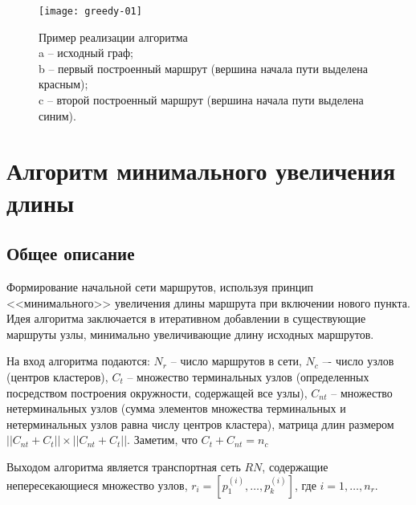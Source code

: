 \begin{figure}[h!]
    \centering
    \texttt{[image: greedy-01]}
    \caption{Пример реализации алгоритма\\
        a -- исходный граф;\\
        b -- первый построенный маршрут (вершина начала пути выделена красным);\\
        c -- второй построенный маршрут (вершина начала пути выделена синим).
    }
   \label{img:greedy-01}
\end{figure}


\section{Алгоритм минимального увеличения длины}
\label{sec:second_alg}
\subsection{Общее описание}

Формирование начальной сети маршрутов, используя принцип <<минимального>> увеличения длины маршрута при 
включении нового пункта. Идея алгоритма заключается в итеративном добавлении в существующие маршруты узлы, 
минимально увеличивающие длину исходных маршрутов. 

На вход алгоритма подаются: \( N_r \) -- число маршрутов в сети, \( N_c \) –- число узлов 
(центров кластеров), \( C_t \) – множество терминальных узлов (определенных посредством построения 
окружности, содержащей все узлы), \( C_{nt} \) -- множество нетерминальных узлов (сумма элементов множества 
терминальных и нетерминальных узлов равна числу центров кластера), матрица длин размером 
\( ||{C_{nt}} + {C_{t}}|| \times ||{C_{nt}} + {C_{t}}|| \). Заметим, что \( C_t + C_{nt} = n_c \)

Выходом алгоритма является транспортная сеть \( RN \), содержащие непересекающиеся множество узлов, 
\( r_{i} = [p_{1}^{(i)}, \dots, p_{k}^{(i)}] \), где \( i = 1, \dots, n_r \). 

